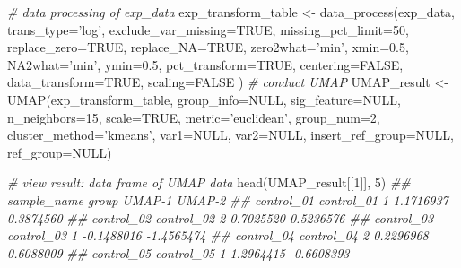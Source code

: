 \documentclass[]{article}
\newcommand{\hlnum}[1]{\textcolor[rgb]{0.816,0.125,0.439}{#1}}%
\newcommand{\hlstr}[1]{\textcolor[rgb]{0.251,0.627,0.251}{#1}}%
\newcommand{\hlcom}[1]{\textcolor[rgb]{0.502,0.502,0.502}{\textit{#1}}}%
\newcommand{\hlstd}[1]{\textcolor[rgb]{0.251,0.251,0.251}{#1}}%
\newcommand{\hlkwc}[1]{\textcolor[rgb]{0.251,0.251,0.251}{#1}}%
\newcommand{\hlkwd}[1]{\textcolor[rgb]{0.878,0.439,0.125}{#1}}%
\newenvironment{Shaded}{\begin{myshaded}}{\end{myshaded}}
\newcommand{\KeywordTok}[1]{\hlkwd{#1}}
\newcommand{\DataTypeTok}[1]{\hlkwc{#1}}
\newcommand{\DecValTok}[1]{\hlnum{#1}}
\newcommand{\FloatTok}[1]{\hlnum{#1}}
\newcommand{\StringTok}[1]{\hlstr{#1}}
\newcommand{\CommentTok}[1]{\hlcom{#1}}
\newcommand{\OtherTok}[1]{{#1}}
\newcommand{\NormalTok}[1]{\hlstd{#1}}
\begin{document}
\begin{Shaded}
\begin{Highlighting}[]
\CommentTok{# data processing of exp_data}
\NormalTok{exp_transform_table <-}\StringTok{ }\KeywordTok{data_process}\NormalTok{(exp_data, }\DataTypeTok{trans_type=}\StringTok{'log'}\NormalTok{,}
                                    \DataTypeTok{exclude_var_missing=}\OtherTok{TRUE}\NormalTok{,}
                                    \DataTypeTok{missing_pct_limit=}\DecValTok{50}\NormalTok{,}
                                    \DataTypeTok{replace_zero=}\OtherTok{TRUE}\NormalTok{, }\DataTypeTok{replace_NA=}\OtherTok{TRUE}\NormalTok{,}
                                    \DataTypeTok{zero2what=}\StringTok{'min'}\NormalTok{, }\DataTypeTok{xmin=}\FloatTok{0.5}\NormalTok{,}
                                    \DataTypeTok{NA2what=}\StringTok{'min'}\NormalTok{, }\DataTypeTok{ymin=}\FloatTok{0.5}\NormalTok{,}
                                    \DataTypeTok{pct_transform=}\OtherTok{TRUE}\NormalTok{, }\DataTypeTok{centering=}\OtherTok{FALSE}\NormalTok{,}
                                    \DataTypeTok{data_transform=}\OtherTok{TRUE}\NormalTok{, }\DataTypeTok{scaling=}\OtherTok{FALSE}\NormalTok{ )}
\CommentTok{# conduct UMAP}
\NormalTok{UMAP_result <-}\StringTok{ }\KeywordTok{UMAP}\NormalTok{(exp_transform_table, }\DataTypeTok{group_info=}\OtherTok{NULL}\NormalTok{,}
                    \DataTypeTok{sig_feature=}\OtherTok{NULL}\NormalTok{, }\DataTypeTok{n_neighbors=}\DecValTok{15}\NormalTok{,}
                    \DataTypeTok{scale=}\OtherTok{TRUE}\NormalTok{, }\DataTypeTok{metric=}\StringTok{'euclidean'}\NormalTok{, }\DataTypeTok{group_num=}\DecValTok{2}\NormalTok{,}
                    \DataTypeTok{cluster_method=}\StringTok{'kmeans'}\NormalTok{, }\DataTypeTok{var1=}\OtherTok{NULL}\NormalTok{, }\DataTypeTok{var2=}\OtherTok{NULL}\NormalTok{,}
                    \DataTypeTok{insert_ref_group=}\OtherTok{NULL}\NormalTok{, }\DataTypeTok{ref_group=}\OtherTok{NULL}\NormalTok{)}

\CommentTok{# view result: data frame of UMAP data}
\KeywordTok{head}\NormalTok{(UMAP_result[[}\DecValTok{1}\NormalTok{]], }\DecValTok{5}\NormalTok{)}
\CommentTok{##            sample_name group     UMAP-1     UMAP-2}
\CommentTok{## control_01  control_01     1  1.1716937  0.3874560}
\CommentTok{## control_02  control_02     2  0.7025520  0.5236576}
\CommentTok{## control_03  control_03     1 -0.1488016 -1.4565474}
\CommentTok{## control_04  control_04     2  0.2296968  0.6088009}
\CommentTok{## control_05  control_05     1  1.2964415 -0.6608393}
\end{Highlighting}
\end{Shaded}
\end{document}
